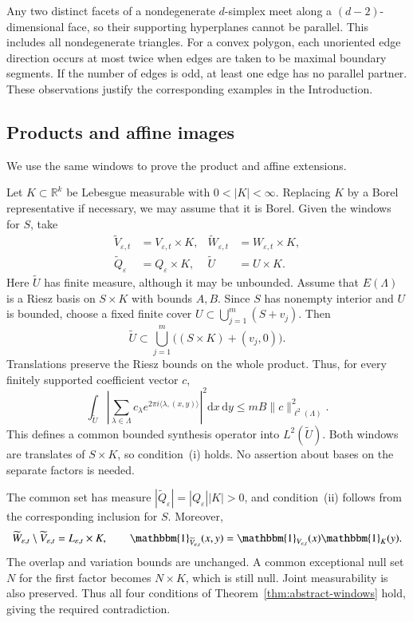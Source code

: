 \documentclass[10pt,a4paper]{amsart}
\def\R{\mathbb{R}}
\def\d{\mathrm{d}}
\newcommand\norm[1]{\|#1\|}
\newcommand\inpro[2]{\langle #1,#2\rangle}
\newcommand\1{\mathbbm{1}}
\newcommand{\eps}{\varepsilon}
\def\d{\mathrm{d}}
\begin{document}
Any two distinct facets of a nondegenerate $d$-simplex meet along a
$(d-2)$-dimensional face, so their supporting hyperplanes cannot be parallel.
This includes all nondegenerate triangles.
For a convex polygon, each unoriented edge direction occurs at most twice
when edges are taken to be maximal boundary segments. If the number of edges
is odd, at least one edge has no parallel partner.
These observations justify the corresponding examples in the Introduction.

\subsection{Products and affine images}

We use the same windows to prove the product and affine extensions.

Let $K\subset\R^k$ be Lebesgue measurable with $0<|K|<\infty$.
Replacing $K$ by a Borel representative if necessary, we may assume that it
is Borel. Given the windows for $S$, take
\begin{equation*}
    \begin{aligned}
    \widetilde V_{\eps,t}&=V_{\eps,t}\times K,&
    \widetilde W_{\eps,t}&=W_{\eps,t}\times K,\\
    \widetilde Q_\eps&=Q_\eps\times K,&
    \widetilde U&=U\times K.
    \end{aligned}
\end{equation*}
Here $\widetilde U$ has finite measure, although it may be unbounded.
Assume that $E(\Lambda)$ is a Riesz basis on $S\times K$ with bounds $A,B$.
Since $S$ has nonempty interior and $U$ is bounded, choose a fixed finite cover
$U\subset\bigcup_{j=1}^{m}(S+v_j)$. Then
\begin{equation*}
    \widetilde U\subset\bigcup_{j=1}^{m}
    \bigl((S\times K)+(v_j,0)\bigr).
\end{equation*}
Translations preserve the Riesz bounds on the whole product. Thus,
for every finitely supported coefficient vector $c$,
\begin{equation*}
    \int_{\widetilde U}
    \left|\sum_{\lambda\in\Lambda}c_\lambda
    e^{2\pi i\inpro{\lambda}{(x,y)}}\right|^2\d x\,\d y
    \le mB\norm{c}_{\ell^2(\Lambda)}^2.
\end{equation*}
This defines a common bounded synthesis operator into $L^2(\widetilde U)$.
Both windows are translates of $S\times K$, so condition~(i) holds.
No assertion about bases on the separate factors is needed.

The common set has measure $|\widetilde Q_\eps|=|Q_\eps||K|>0$,
and condition~(ii) follows from the corresponding inclusion for $S$.
Moreover,
\begin{equation*}
    \widetilde W_{\eps,t}\setminus\widetilde V_{\eps,t}
    =L_{\eps,t}\times K,\qquad
    \1_{\widetilde V_{\eps,t}}(x,y)
    =\1_{V_{\eps,t}}(x)\1_K(y).
\end{equation*}
The overlap and variation bounds are unchanged. A common exceptional null
set $N$ for the first factor becomes $N\times K$, which is still null.
Joint measurability is also preserved. Thus all four conditions of
Theorem~\ref{thm:abstract-windows} hold, giving the required contradiction.
\end{document}
